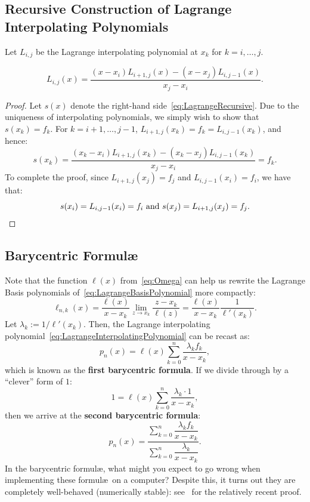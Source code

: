 \subsection{Recursive Construction of Lagrange Interpolating Polynomials}

Let $L_{i,j}$ be the Lagrange interpolating polynomial at $x_k$ for $k=i,\ldots,j$.

\begin{theorem}
\begin{equation}\label{eq:LagrangeRecursive}
L_{i,j}(x) = \dfrac{(x-x_i)L_{i+1,j}(x)-(x-x_j)L_{i,j-1}(x)}{x_j-x_i}.
\end{equation}
\end{theorem}
\begin{proof}
Let $s(x)$ denote the right-hand side~\eqref{eq:LagrangeRecursive}. Due to the uniqueness of interpolating polynomials, we simply wish to show that $s(x_k) = f_k$. For $k=i+1,\ldots,j-1$, $L_{i+1,j}(x_k) = f_k = L_{i,j-1}(x_k)$, and hence:
\[
s(x_k) = \dfrac{(x_k-x_i)L_{i+1,j}(x_k)-(x_k-x_j)L_{i,j-1}(x_k)}{x_j-x_i} = f_k.
\]
To complete the proof, since $L_{i+1,j}(x_j) = f_j$ and $L_{i,j-1}(x_i) = f_i$, we have that:
\[
s(x_i) = L_{i,j-1}(x_i) = f_i \hbox{ and } s(x_j) = L_{i+1,j}(x_j) = f_j.
\]
\end{proof}

\subsection{Barycentric Formul\ae}

Note that the function $\ell(x)$ from~\eqref{eq:Omega} can help us rewrite the Lagrange Basis polynomials of~\eqref{eq:LagrangeBasisPolynomial} more compactly:
\begin{equation}
\ell_{n,k}(x) = \dfrac{\ell(x)}{x-x_k}\lim_{z\to x_k}\dfrac{z-x_k}{\ell(z)} = \dfrac{\ell(x)}{x-x_k}\dfrac{1}{\ell'(x_k)}.
\end{equation}
Let $\lambda_k := 1/\ell'(x_k)$. Then, the Lagrange interpolating polynomial~\eqref{eq:LagrangeInterpolatingPolynomial} can be recast as:
\begin{equation}\label{eq:Barycentric1}
p_n(x) = \ell(x)\sum_{k=0}^n \dfrac{\lambda_kf_k}{x-x_k},
\end{equation}
which is known as the {\bf first barycentric formula}. If we divide through by a ``clever'' form of $1$:
\begin{equation}
1 = \ell(x)\sum_{k=0}^n \dfrac{\lambda_k\cdot 1}{x-x_k},
\end{equation}
then we arrive at the {\bf second barycentric formula}:
\begin{equation}\label{eq:Barycentric2}
p_n(x) = \dfrac{\displaystyle\sum_{k=0}^n \dfrac{\lambda_kf_k}{x-x_k}}{\displaystyle\sum_{k=0}^n \dfrac{\lambda_k}{x-x_k}}.
\end{equation}
In the barycentric formul\ae, what might you expect to go wrong when implementing these formul\ae~on a computer? Despite this, it turns out they are completely well-behaved (numerically stable): see~\cite{Higham-24-547-04} for the relatively recent proof.

